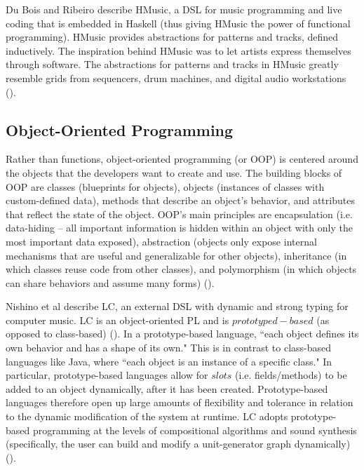 \documentclass{report}
\newcommand\citeparen[1]{(\cite{#1})}
\begin{document}
Du Bois and Ribeiro describe HMusic, a DSL for music programming and live coding that is embedded in Haskell (thus giving HMusic the power  of functional programming). HMusic provides abstractions for patterns and tracks, defined inductively. The inspiration behind HMusic was to let artists express  themselves through software. The abstractions for patterns and  tracks in HMusic greatly resemble grids from sequencers, drum  machines, and digital audio workstations \citeparen{bois_ribeiro_1970}.

\subsection{Object-Oriented Programming}
Rather  than functions, object-oriented programming (or OOP) is centered around the objects that the developers want to create and  use. The  building blocks  of OOP  are  classes (blueprints for  objects),  objects (instances  of classes with custom-defined data),  methods that describe an object's behavior,  and  attributes that reflect the state of the  object. OOP's main  principles are encapsulation  (i.e. data-hiding -- all important information  is  hidden within  an  object with  only the  most  important data  exposed),  abstraction  (objects only  expose internal mechanisms  that are  useful and  generalizable for other  objects), inheritance (in which classes reuse  code  from other classes),  and polymorphism (in which objects  can  share behaviors and assume many forms) \citeparen{gillis_lewis_2021}.

Nishino et al describe LC, an  external DSL with dynamic and strong typing for computer music. LC is  an object-oriented PL and is $prototyped-based$ (as opposed  to  class-based) \citeparen{nishino_osaka_nakatsu_2013}. In a prototype-based language, ``each object defines its own behavior and has a shape of its own." This is in contrast to class-based languages like Java, where ``each object is an instance of a specific class." In particular, prototype-based languages allow for $slots$ (i.e. fields/methods)  to be  added  to an  object  dynamically, after it  has been  created. Prototype-based languages therefore open up large amounts of flexibility and tolerance  in relation to the dynamic modification of the system at runtime. LC adopts prototype-based programming at the levels of compositional algorithms  and sound synthesis (specifically, the user can build and modify a unit-generator graph dynamically) \citeparen{nishino_osaka_nakatsu_2014}.
\end{document}
